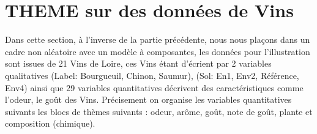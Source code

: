 \documentclass[a4paper,french,10pt]{article}
\begin{document}



\newpage

\section{THEME sur des données de Vins}

Dans cette section, à l'inverse de la partie précédente, nous nous plaçons dans un cadre non aléatoire avec un modèle à composantes, les données pour l'illustration sont issues de 21 Vins de Loire, ces Vins étant d'écrient par 2 variables qualitatives (Label: Bourgueuil, Chinon, Saumur), (Sol: En1, Env2, Référence, Env4) ainsi que 29 variables quantitatives décrivent des
caractéristiques comme l’odeur, le goût des Vins. \newline
Précisement on organise les variables quantitatives suivants les blocs de thèmes suivants : odeur, arôme, goût, note de goût, plante et composition (chimique).\newline
\end{document}
